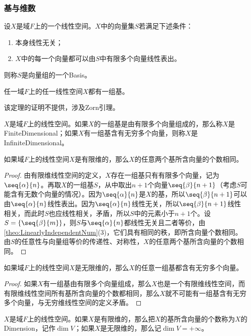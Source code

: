 \subsubsection{基与维数}
\begin{definition}
	设$X$是域$F$上的一个线性空间。$X$中的向量集$S$若满足下述条件：
	\begin{enumerate}
		\item 本身线性无关；
		\item $X$中的每一个向量都可以由$S$中有限多个向量线性表出。
	\end{enumerate}
	则称$S$是向量组的一个\gls{Basis}。
\end{definition}
\begin{theorem}\label{theo:ExistenceOfBasis}
	任一域$F$上的任一线性空间$X$都有一组基。
\end{theorem}
该定理的证明不提供，涉及Zorn引理。
\begin{definition}
	$X$是域$F$上的线性空间。如果$X$的一组基是由有限多个向量组成的，那么称$X$是\gls{FiniteDimensional}；如果$X$有一组基含有无穷多个向量，则称$X$是\gls{InfiniteDimensional}。
\end{definition}
\begin{theorem}
	如果域$F$上的线性空间$X$是有限维的，那么$X$的任意两个基所含向量的个数相同。
\end{theorem}
\begin{proof}
	由有限维线性空间的定义，$X$存在一组基只有有限多个向量，记为$\seq{\alpha}{n}$。再取$X$的一组基$S$，从中取出$n+1$个向量$\seq{\beta}{n+1}$（考虑$S$可能含有无数个向量的情况）。因为$\seq{\alpha}{n}$是$X$的基，所以$\seq{\beta}{n+1}$可以由$\seq{\alpha}{n}$线性表出。因为$\seq{\alpha}{n}$线性无关，所以$\seq{\beta}{n+1}$线性相关，而此时$S$也应线性相关，矛盾，所以$S$中的元素小于$n+1$个。设$S=\{\seq{\beta}{m}\}$，则$S$与$\seq{\alpha}{n}$都线性无关且二者等价，由\cref{theo:LinearlyIndependentNum}(3)，它们具有相同的秩，即所含向量个数相同。由$S$的任意性与向量组等价的传递性、对称性，$X$的任意两个基所含向量的个数相同。
\end{proof}
\begin{corollary}
	如果域$F$上的线性空间$X$是无限维的，那么$X$的任意一组基都含有无穷多个向量。
\end{corollary}
\begin{proof}
	如果$X$有一组基由有限多个向量组成，那么$X$也是一个有限维线性空间，而有限维线性空间所有基所含向量的个数都相同，那么$X$就不可能有一组基含有无穷多个向量，与无穷维线性空间的定义矛盾。
\end{proof}
\begin{definition}
	$X$是域$F$上的线性空间。如果$X$是有限维的，那么把$X$的基所含向量的个数称为$X$的\gls{Dimension}，记作$\operatorname{dim}V$；如果$X$是无限维的，那么记$\dim V=+\infty$。
\end{definition}
